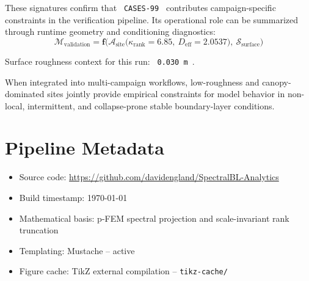 \documentclass[11pt,a4paper]{article}
\begin{document}
These signatures confirm that \texttt{ CASES-99 } contributes campaign-specific constraints in the verification pipeline. Its operational role can be summarized through runtime geometry and conditioning diagnostics:
\begin{equation}
    \mathcal{M}_{\text{validation}} = \mathbf{f}\Big(\mathcal{A}_{\text{site}}\big(\kappa_{\text{rank}}=6.85,\ D_{\text{eff}}=2.0537\big),\ \mathcal{S}_{\text{surface}}\Big)
\end{equation}

Surface roughness context for this run: \texttt{ 0.030 m }.

When integrated into multi-campaign workflows, low-roughness and canopy-dominated sites jointly provide empirical constraints for model behavior in non-local, intermittent, and collapse-prone stable boundary-layer conditions.

\label{sec:conclusions_CASES-99}
 
\newpage

\appendix

\section{Pipeline Metadata}

\begin{itemize}
    \item Source code: \url{https://github.com/davidengland/SpectralBL-Analytics}
    \item Build timestamp: \today{}
    \item Mathematical basis: p-FEM spectral projection and scale-invariant rank truncation
    \item Templating: Mustache -- active
    \item Figure cache: TikZ external compilation -- \texttt{tikz-cache/}
\end{itemize}
\end{document}
